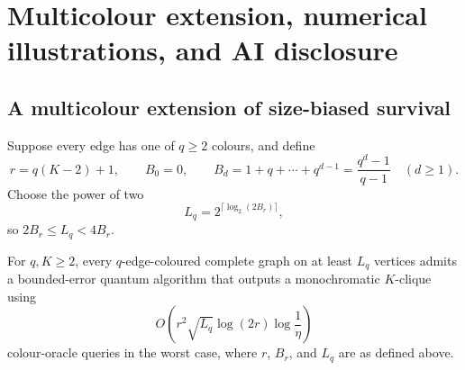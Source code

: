 \section{Multicolour extension, numerical illustrations, and AI disclosure}
\label{app:extensions}

\subsection{A multicolour extension of size-biased survival}
\label{app:multicolour}

Suppose every edge has one of $q\ge2$ colours, and define
\[
 r=q(K-2)+1,
 \qquad
 B_0=0,
 \qquad
 B_d=1+q+\cdots+q^{d-1}=\frac{q^d-1}{q-1}\quad(d\ge1).
\]
Choose the power of two
\[
 L_q=2^{\lceil\log_2(2B_r)\rceil},
\]
so $2B_r\le L_q<4B_r$.

\begin{corollary}
\label{cor:multicolour}
For $q,K\ge2$, every $q$-edge-coloured complete graph on at least $L_q$
vertices admits a bounded-error quantum algorithm that outputs a
monochromatic $K$-clique using
\[
 O\!\left(r^2\sqrt{L_q}\log(2r)\log\frac1\eta\right)
\]
colour-oracle queries in the worst case, where $r$, $B_r$, and $L_q$ are as
defined above.
\end{corollary}

